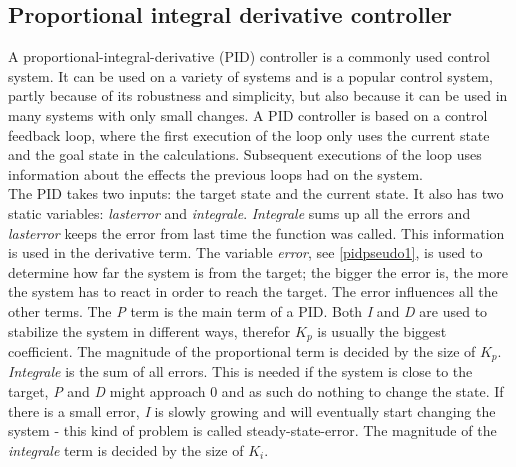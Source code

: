 \subsection{Proportional integral derivative controller}\label{hardware:PID}
A proportional-integral-derivative (PID) controller is a commonly used control system. It can be used on a variety of systems and is a popular control system, partly because of its robustness and simplicity, but also because it can be used in many systems with only small changes. A PID controller is based on a control feedback loop, where the first execution of the loop only uses the current state and the goal state in the calculations. Subsequent executions of the loop uses information about the effects the previous loops had on the system. %
\\

The PID takes two inputs: the target state and the current state. It also has two static variables: \textit{lasterror} and \textit{integrale}. \textit{Integrale} sums up all the errors and \textit{lasterror} keeps the error from last time the function was called. This information is used in the derivative term. The variable \textit{error}, see \cref{pidpseudo1}, is used to determine how far the system is from the target; the bigger the error is, the more the system has to react in order to reach the target. The error influences all the other terms. The \textit{P} term is the main term of a PID. Both \textit{I} and \textit{D} are used to stabilize the system in different ways, therefor $K_p$ is usually the biggest coefficient. The magnitude of the proportional term is decided by the size of $K_p$.\\

\textit{Integrale} is the sum of all errors. This is needed if the system is close to the target, \textit{P} and \textit{D} might approach 0 and as such do nothing to change the state. If there is a small error, \textit{I} is slowly growing and will eventually start changing the system - this kind of problem is called steady-state-error. The magnitude of the \textit{integrale} term is decided by the size of $K_i$.\\

